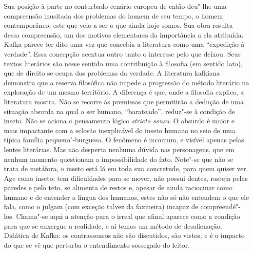 Sua posição à parte no conturbado cenário europeu de então deu"-lhe uma
compreensão inusitada dos problemas do homem de seu tempo, o homem
contemporâneo, este que veio a ser o que ainda hoje somos. Sua obra
resulta dessa compreensão, um dos motivos elementares da importância a
ela atribuída. Kafka parece ter dito uma vez que concebia a literatura
como uma “expedição à verdade”. Essa concepção
acentua outro tanto o interesse pelo que deixou. Seus textos literários
são nesse sentido uma contribuição à filosofia (em sentido lato), que
de direito se ocupa dos problemas da verdade. A literatura kafkiana
demonstra que a reserva filosófica não impede a progressão do método
literário na exploração de um mesmo território. A diferença é que, onde
a filosofia explica, a literatura mostra. Não se recorre às premissas
que permitirão a dedução de uma situação absurda na qual o ser humano,
“barateado”, reduz"-se à condição de inseto. Não se aciona o
pensamento lógico \textit{stricto sensu}. O absurdo é maior e mais
impactante com a eclosão inexplicável do inseto humano no seio de uma
típica família pequeno"-burguesa. O fenômeno é incomum, e visível
apenas pelas lentes literárias. Mas não desperta nenhuma dúvida nas
personagens, que em nenhum momento questionam a impossibilidade do
fato. Note"-se que não se trata de metáfora, o inseto está lá em toda
sua concretude, para quem quiser ver. Age como inseto: tem dificuldades
para se mover, não possui dentes, rasteja pelas paredes e pelo teto,
se alimenta de restos e, apesar de ainda raciocinar como humano e de
entender a língua dos humanos, estes não só não entendem o que ele
fala, como o julgam (com exceção talvez da faxineira) incapaz de
compreendê"-los. Chama"-se aqui a atenção para o irreal que afinal
aparece como a condição para que se enxergue a realidade, e aí temos um
método de desalienação. Didática de Kafka: os contrassensos não são
discutidos, são vistos, e é o impacto do que se vê que perturba o
entendimento sossegado do leitor.

